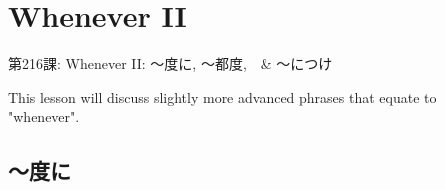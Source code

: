     
\chapter{Whenever II}

\begin{center}
\begin{Large}
第216課: Whenever II: ～度に, ～都度,　\& ～につけ 
\end{Large}
\end{center}
 
\par{ This lesson will discuss slightly more advanced phrases that equate to "whenever". }
      
\section{～度に}
 
